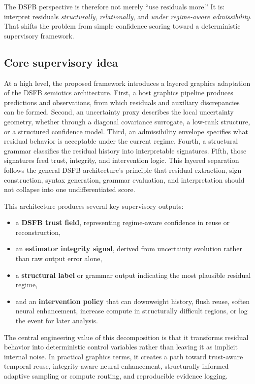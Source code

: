 \documentclass[11pt]{article}
\theoremstyle{definition}
\theoremstyle{plain}
\begin{document}
The DSFB perspective is therefore not merely “use residuals more.” It is: interpret residuals \emph{structurally}, \emph{relationally}, and \emph{under regime-aware admissibility}. That shifts the problem from simple confidence scoring toward a deterministic supervisory framework.


\subsection{Core supervisory idea}

At a high level, the proposed framework introduces a layered graphics adaptation of the DSFB semiotics architecture. First, a host graphics pipeline produces predictions and observations, from which residuals and auxiliary discrepancies can be formed. Second, an uncertainty proxy describes the local uncertainty geometry, whether through a diagonal covariance surrogate, a low-rank structure, or a structured confidence model. Third, an admissibility envelope specifies what residual behavior is acceptable under the current regime. Fourth, a structural grammar classifies the residual history into interpretable signatures. Fifth, those signatures feed trust, integrity, and intervention logic. This layered separation follows the general DSFB architecture’s principle that residual extraction, sign construction, syntax generation, grammar evaluation, and interpretation should not collapse into one undifferentiated score. 

This architecture produces several key supervisory outputs:
\begin{itemize}[leftmargin=1.5em]
    \item a \textbf{DSFB trust field}, representing regime-aware confidence in reuse or reconstruction,
    \item an \textbf{estimator integrity signal}, derived from uncertainty evolution rather than raw output error alone,
    \item a \textbf{structural label} or grammar output indicating the most plausible residual regime,
    \item and an \textbf{intervention policy} that can downweight history, flush reuse, soften neural enhancement, increase compute in structurally difficult regions, or log the event for later analysis.
\end{itemize}

The central engineering value of this decomposition is that it transforms residual behavior into deterministic control variables rather than leaving it as implicit internal noise. In practical graphics terms, it creates a path toward trust-aware temporal reuse, integrity-aware neural enhancement, structurally informed adaptive sampling or compute routing, and reproducible evidence logging.
\end{document}
